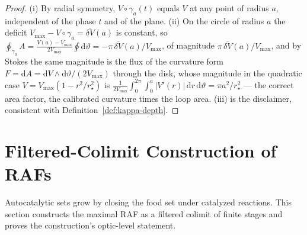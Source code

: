 \documentclass[11pt,a4paper]{article}
\theoremstyle{plain}
\theoremstyle{definition}
\theoremstyle{remark}
\begin{document}
\begin{proof}
(i) By radial symmetry, $V \circ \gamma_a(t)$ equals $V$ at any
point of radius $a$, independent of the phase $t$ and of the plane.
(ii) On the circle of radius $a$ the deficit
$V_{\max} - V \circ \gamma_a = \overline{\delta V}(a)$ is constant,
so $\oint_{\gamma_a} A = \frac{V(a)-V_{\max}}{2V_{\max}}
\oint \mathrm{d}\vartheta =
-\pi\,\overline{\delta V}(a)/V_{\max}$, of magnitude
$\pi\,\overline{\delta V}(a)/V_{\max}$,
and by Stokes the same magnitude is the flux of the curvature form
$F = \mathrm{d}A = \mathrm{d}V \wedge \mathrm{d}\vartheta/(2V_{\max})
$ through the disk, whose magnitude in the quadratic case
$V = V_{\max}(1 - r^2/r_\star^2)$ is
$\tfrac{1}{2V_{\max}}\int_{0}^{2\pi}\!\!\int_{0}^{a} |V'(r)|\,
\mathrm{d}r\,\mathrm{d}\vartheta = \pi a^2/r_\star^{2}$ --- the
correct area factor, the calibrated curvature times the loop area.
(iii) is the disclaimer, consistent with
Definition~\ref{def:kappa-depth}.
\end{proof}


\section{Filtered-Colimit Construction of RAFs}\label{sec:invlim}

Autocatalytic sets grow by closing the food set under catalyzed
reactions. This section constructs the maximal RAF as a filtered
colimit of finite stages and proves the construction's optic-level
statement.
\end{document}
